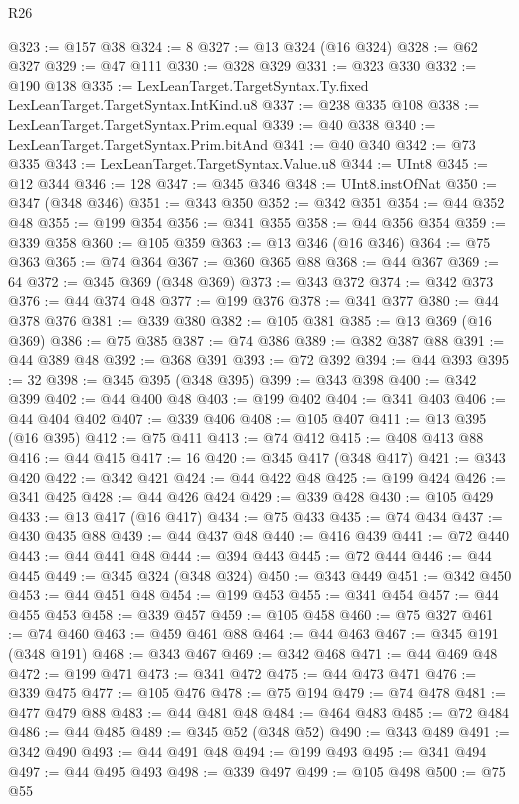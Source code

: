 \begin{lexlean}{R26}
\begin{coremodule}
@323 := @157 @38
@324 := 8
@327 := @13 @324 (@16 @324)
@328 := @62 @327
@329 := @47 @111
@330 := @328 @329
@331 := @323 @330
@332 := @190 @138
@335 := LexLeanTarget.TargetSyntax.Ty.fixed LexLeanTarget.TargetSyntax.IntKind.u8
@337 := @238 @335 @108
@338 := LexLeanTarget.TargetSyntax.Prim.equal
@339 := @40 @338
@340 := LexLeanTarget.TargetSyntax.Prim.bitAnd
@341 := @40 @340
@342 := @73 @335
@343 := LexLeanTarget.TargetSyntax.Value.u8
@344 := UInt8
@345 := @12 @344
@346 := 128
@347 := @345 @346
@348 := UInt8.instOfNat
@350 := @347 (@348 @346)
@351 := @343 @350
@352 := @342 @351
@354 := @44 @352 @48
@355 := @199 @354
@356 := @341 @355
@358 := @44 @356 @354
@359 := @339 @358
@360 := @105 @359
@363 := @13 @346 (@16 @346)
@364 := @75 @363
@365 := @74 @364
@367 := @360 @365 @88
@368 := @44 @367
@369 := 64
@372 := @345 @369 (@348 @369)
@373 := @343 @372
@374 := @342 @373
@376 := @44 @374 @48
@377 := @199 @376
@378 := @341 @377
@380 := @44 @378 @376
@381 := @339 @380
@382 := @105 @381
@385 := @13 @369 (@16 @369)
@386 := @75 @385
@387 := @74 @386
@389 := @382 @387 @88
@391 := @44 @389 @48
@392 := @368 @391
@393 := @72 @392
@394 := @44 @393
@395 := 32
@398 := @345 @395 (@348 @395)
@399 := @343 @398
@400 := @342 @399
@402 := @44 @400 @48
@403 := @199 @402
@404 := @341 @403
@406 := @44 @404 @402
@407 := @339 @406
@408 := @105 @407
@411 := @13 @395 (@16 @395)
@412 := @75 @411
@413 := @74 @412
@415 := @408 @413 @88
@416 := @44 @415
@417 := 16
@420 := @345 @417 (@348 @417)
@421 := @343 @420
@422 := @342 @421
@424 := @44 @422 @48
@425 := @199 @424
@426 := @341 @425
@428 := @44 @426 @424
@429 := @339 @428
@430 := @105 @429
@433 := @13 @417 (@16 @417)
@434 := @75 @433
@435 := @74 @434
@437 := @430 @435 @88
@439 := @44 @437 @48
@440 := @416 @439
@441 := @72 @440
@443 := @44 @441 @48
@444 := @394 @443
@445 := @72 @444
@446 := @44 @445
@449 := @345 @324 (@348 @324)
@450 := @343 @449
@451 := @342 @450
@453 := @44 @451 @48
@454 := @199 @453
@455 := @341 @454
@457 := @44 @455 @453
@458 := @339 @457
@459 := @105 @458
@460 := @75 @327
@461 := @74 @460
@463 := @459 @461 @88
@464 := @44 @463
@467 := @345 @191 (@348 @191)
@468 := @343 @467
@469 := @342 @468
@471 := @44 @469 @48
@472 := @199 @471
@473 := @341 @472
@475 := @44 @473 @471
@476 := @339 @475
@477 := @105 @476
@478 := @75 @194
@479 := @74 @478
@481 := @477 @479 @88
@483 := @44 @481 @48
@484 := @464 @483
@485 := @72 @484
@486 := @44 @485
@489 := @345 @52 (@348 @52)
@490 := @343 @489
@491 := @342 @490
@493 := @44 @491 @48
@494 := @199 @493
@495 := @341 @494
@497 := @44 @495 @493
@498 := @339 @497
@499 := @105 @498
@500 := @75 @55

\end{coremodule}
\end{lexlean}
